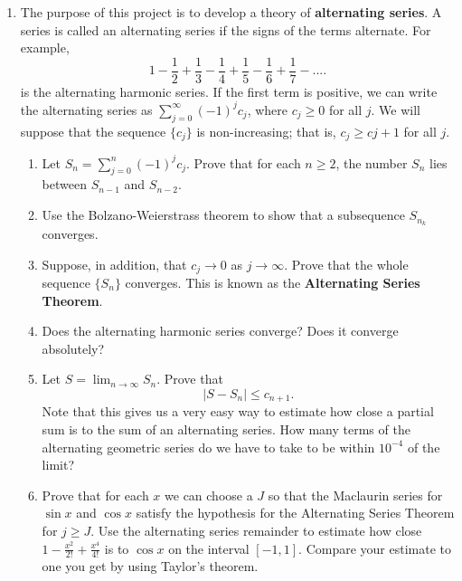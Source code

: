 \documentclass{article}
\begin{document}
\begin{enumerate}
      \item The purpose of this project is to develop a theory of
            \textbf{alternating series}. A series is called an alternating
            series if the signs of the terms alternate. For example,
            \[
                  1-\frac{1}{2}+\frac{1}{3}-\frac{1}{4}+\frac{1}{5}
                  -\frac{1}{6}+\frac{1}{7}-....
            \]
            is the alternating harmonic series. If the first term is positive,
            we can write the alternating series as $\sum_{j=0}^\infty(-1)^jc_j$,
            where $c_j\geq 0$ for all $j$. We will suppose that the sequence
            $\{c_j\}$ is non-increasing; that is, $c_j\geq c{j+1}$ for all $j$.
            \begin{enumerate}
                  \item Let $S_n=\sum_{j=0}^n(-1)^jc_j$. Prove that for each $n\geq 2$,
                        the number $S_n$ lies between $S_{n-1}$ and $S_{n-2}$.
                  \item  Use the Bolzano-Weierstrass theorem to show that a subsequence
                        $S_{n_k}$ converges.
                  \item Suppose, in addition, that $c_j\to 0$ as $j\to\infty$. Prove that
                        the whole sequence $\{S_n\}$ converges. This is known as the
                        \textbf{Alternating Series Theorem}.
                  \item Does the alternating harmonic series converge? Does it converge
                        absolutely?
                  \item Let $S=\lim_{n\to\infty}S_n$. Prove that
                        \[
                              \lvert S-S_n\rvert \leq c_{n+1}.
                        \]
                        Note that this gives us a very easy way to estimate how close a
                        partial sum is to the sum of an alternating series. How many terms
                        of the alternating geometric series do we have to take to be within
                        $10^{-4}$ of the limit?
                  \item Prove that for each $x$ we can choose a $J$ so that the Maclaurin
                        series for $\sin x$ and $\cos x$ satisfy the hypothesis for the
                        Alternating Series Theorem for $j\geq J$. Use the alternating series
                        remainder to estimate how close $1-\frac{x^2}{2!}+\frac{x^4}{4!}$ is
                        to $\cos x$ on the interval $[-1,1]$. Compare your estimate to one
                        you get by using Taylor's theorem.
            \end{enumerate}
\end{enumerate}
\end{document}
